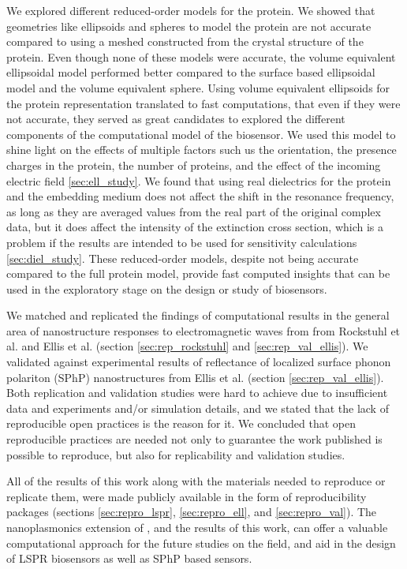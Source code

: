 We explored different reduced-order models for the protein. We showed that geometries like ellipsoids and spheres
to model the protein are not accurate compared to using a meshed constructed from the crystal structure of the protein. Even though
none of these models were accurate, the volume equivalent ellipsoidal model performed better compared to the surface based ellipsoidal 
model and the volume equivalent sphere. Using volume equivalent ellipsoids for the protein representation 
translated to fast computations, that even if they were not accurate, they served as great candidates to explored the different components of the 
computational model of the biosensor. We used this model to shine light on the effects of multiple factors such us 
the orientation, the presence charges in the protein, the number of proteins, and the effect of the incoming electric field \ref{sec:ell_study}.
We found that using real dielectrics for the protein and the embedding medium does not affect the shift in the resonance frequency, 
as long as they are averaged values from the real part of the original complex data, but it does affect the intensity of the extinction 
cross section, which is a problem if the results are intended to be used for sensitivity calculations \ref{sec:diel_study}. 
These reduced-order models, despite not being accurate compared to the full protein model, provide fast computed insights that can be used 
in the exploratory stage on the design or study of biosensors.

We matched and replicated the findings of computational results in the general area of nanostructure responses to electromagnetic waves from 
from Rockstuhl et al. \cite{rockstuhl2005} and Ellis et al.\cite{ellis2016} (section \ref{sec:rep_rockstuhl} and \ref{sec:rep_val_ellis}). We validated \pygbe against experimental results of reflectance 
of localized surface phonon polariton (SPhP) nanostructures from Ellis et al. (section \ref{sec:rep_val_ellis}). Both replication and validation 
studies were hard to achieve due to insufficient data and experiments and/or simulation details, and we stated that the lack of reproducible open
practices is the reason for it. We concluded that open reproducible practices are needed not only to guarantee the work published is possible 
to reproduce, but also for replicability and validation studies. 

All of the results of this work along with the materials needed to reproduce or replicate them, were made publicly available in the form of 
reproducibility packages (sections \ref{sec:repro_lspr}, \ref{sec:repro_ell}, and \ref{sec:repro_val}). 
The nanoplasmonics extension of \pygbe, and the results of this work, can offer a valuable computational approach for 
the future studies on the field, and aid in the design of LSPR biosensors as well as SPhP based sensors. 


